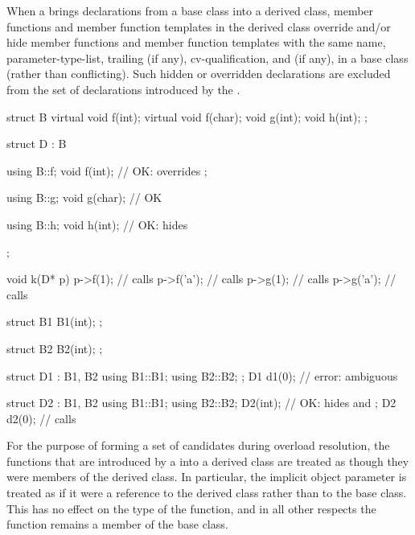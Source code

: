 \pnum
{}%
When a  brings declarations from a base class into
a derived class, member functions and member function templates in
the derived class override and/or hide member functions and member
function templates with the same
name,
parameter-type-list,
trailing  (if any),
cv-qualification, and
 (if any),
in a base
class (rather than conflicting).
Such hidden or overridden declarations are excluded from the set of
declarations introduced by the .
\begin{example}
\begin{codeblock}
struct B {
  virtual void f(int);
  virtual void f(char);
  void g(int);
  void h(int);
};

struct D : B {
  using B::f;
  void f(int);      // OK:  overrides ;

  using B::g;
  void g(char);     // OK

  using B::h;
  void h(int);      // OK:  hides 
};

void k(D* p)
{
  p->f(1);          // calls 
  p->f('a');        // calls 
  p->g(1);          // calls 
  p->g('a');        // calls 
}

struct B1 {
  B1(int);
};

struct B2 {
  B2(int);
};

struct D1 : B1, B2 {
  using B1::B1;
  using B2::B2;
};
D1 d1(0);           // error: ambiguous

struct D2 : B1, B2 {
  using B1::B1;
  using B2::B2;
  D2(int);          // OK:  hides  and 
};
D2 d2(0);           // calls 
\end{codeblock}
\end{example}

\pnum
{}%
\begin{note}
For the purpose of forming a set of candidates during overload resolution,
the functions that are
introduced by a  into a derived class
are treated as though they were members of the derived class. In
particular, the implicit object parameter is treated as if
it were a reference to the derived class rather than to the base class.
This has no effect on the type of the function, and in all other
respects the function remains a member of the base class.
\end{note}

